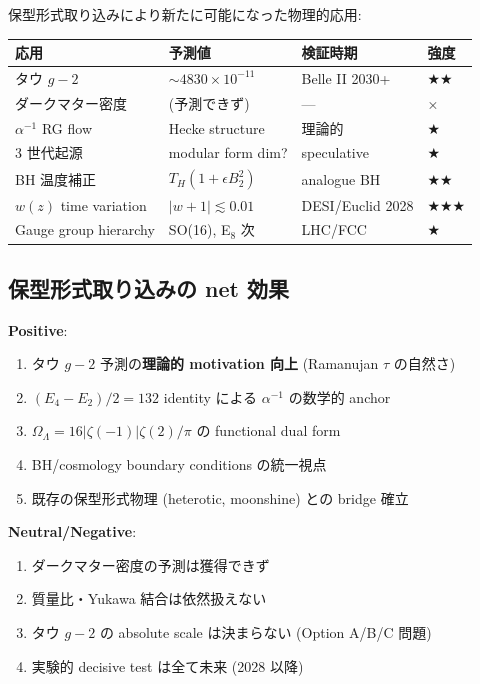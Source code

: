 \documentclass[11pt,a4paper]{article}
\begin{document}
保型形式取り込みにより新たに可能になった物理的応用:

\begin{center}
\small
\begin{tabular}{llll}
\toprule
応用 & 予測値 & 検証時期 & 強度 \\
\midrule
タウ $g-2$ & $\sim 4830 \times 10^{-11}$ & Belle II 2030+ & ★★ \\
ダークマター密度 & (予測できず) & — & × \\
$\alpha^{-1}$ RG flow & Hecke structure & 理論的 & ★ \\
3 世代起源 & modular form dim? & speculative & ★ \\
BH 温度補正 & $T_H(1+\epsilon B_2^2)$ & analogue BH & ★★ \\
$w(z)$ time variation & $|w+1| \lesssim 0.01$ & DESI/Euclid 2028 & ★★★ \\
Gauge group hierarchy & SO(16), E$_8$ 次 & LHC/FCC & ★ \\
\bottomrule
\end{tabular}
\end{center}

\subsection{保型形式取り込みの net 効果}

\textbf{Positive}:
\begin{enumerate}
\item タウ $g-2$ 予測の\textbf{理論的 motivation 向上} (Ramanujan $\tau$ の自然さ)
\item $(E_4 - E_2)/2 = 132$ identity による $\alpha^{-1}$ の数学的
anchor
\item $\Omega_\Lambda = 16|\zeta(-1)|\zeta(2)/\pi$ の functional dual form
\item BH/cosmology boundary conditions の統一視点
\item 既存の保型形式物理 (heterotic, moonshine) との bridge 確立
\end{enumerate}

\textbf{Neutral/Negative}:
\begin{enumerate}
\item ダークマター密度の予測は獲得できず
\item 質量比・Yukawa 結合は依然扱えない
\item タウ $g-2$ の absolute scale は決まらない (Option A/B/C 問題)
\item 実験的 decisive test は全て未来 (2028 以降)
\end{enumerate}
\end{document}
